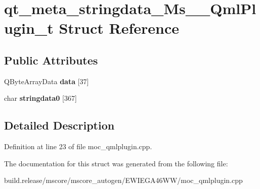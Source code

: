 \hypertarget{structqt__meta__stringdata___ms_____qml_plugin__t}{}\section{qt\+\_\+meta\+\_\+stringdata\+\_\+\+Ms\+\_\+\+\_\+\+Qml\+Plugin\+\_\+t Struct Reference}
\label{structqt__meta__stringdata___ms_____qml_plugin__t}
\subsection*{Public Attributes}
\begin{DoxyCompactItemize}
\item 
\mbox{\label{structqt__meta__stringdata___ms_____qml_plugin__t_a80043a26f027837d241b6561d3f8891a}} 
Q\+Byte\+Array\+Data {\bfseries data} \mbox{[}37\mbox{]}
\item 
\mbox{\label{structqt__meta__stringdata___ms_____qml_plugin__t_afa6f7ef3b4db4d5254dfc71328e560aa}} 
char {\bfseries stringdata0} \mbox{[}367\mbox{]}
\end{DoxyCompactItemize}


\subsection{Detailed Description}


Definition at line 23 of file moc\+\_\+qmlplugin.\+cpp.



The documentation for this struct was generated from the following file\+:\begin{DoxyCompactItemize}
\item 
build.\+release/mscore/mscore\+\_\+autogen/\+E\+W\+I\+E\+G\+A46\+W\+W/moc\+\_\+qmlplugin.\+cpp\end{DoxyCompactItemize}
